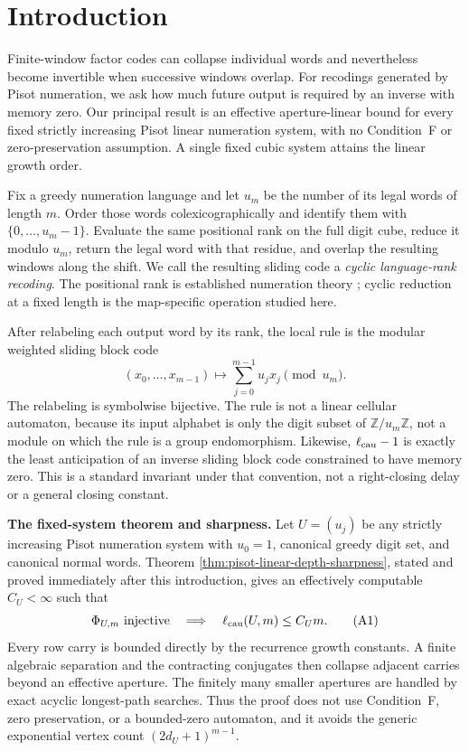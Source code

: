 \section{Introduction}\label{sec:intro}

Finite-window factor codes can collapse individual words and nevertheless
become invertible when successive windows overlap.  For recodings generated
by Pisot numeration, we ask how much future output is required by an inverse
with memory zero.  Our principal result is an effective aperture-linear bound
for every fixed strictly increasing Pisot linear numeration system, with no
Condition~F or zero-preservation assumption.  A single fixed cubic system
attains the linear growth order.

Fix a greedy numeration language and let $u_m$ be the number of its legal
words of length $m$.  Order those words colexicographically and identify them
with $\{0,\ldots,u_m-1\}$.  Evaluate the same positional rank on the full
digit cube, reduce it modulo $u_m$, return the legal word with that residue,
and overlap the resulting windows along the shift.  We call the resulting
sliding code a \emph{cyclic language-rank recoding}.  The positional rank is
established numeration theory
\cite{BertrandMathis1989,BruyereHansel1997,LecomteRigo2001,
CharlierCisterninoStipulanti2022}; cyclic reduction at a fixed length is the
map-specific operation studied here.

After relabeling each output word by its rank, the local rule is the modular
weighted sliding block code
\[
(x_0,\ldots,x_{m-1})\longmapsto
\sum_{j=0}^{m-1}u_jx_j\pmod {u_m}.
\]
The relabeling is symbolwise bijective.  The rule is not a linear cellular
automaton, because its input alphabet is only the digit subset of
$\mathbb Z/u_m\mathbb Z$, not a module on which the rule is a group
endomorphism.  Likewise, $\ell_{\rm cau}-1$ is exactly the least anticipation
of an inverse sliding block code constrained to have memory zero.  This is a
standard invariant under that convention, not a right-closing delay or a
general closing constant.

\medskip
\noindent\textbf{The fixed-system theorem and sharpness.}
Let $U=(u_j)$ be any strictly increasing Pisot numeration system with
$u_0=1$, canonical greedy digit set, and canonical normal words.  Theorem
\ref{thm:pisot-linear-depth-sharpness}, stated and proved immediately after
this introduction, gives an effectively computable $C_U<\infty$ such that
\[
\Phi_{U,m}\text{ injective}\quad\Longrightarrow\quad
\ell_{\rm cau}(U,m)\le C_Um. \tag{A1}
\]
Every row carry is bounded directly by the recurrence growth constants.  A
finite algebraic separation and the contracting conjugates then collapse
adjacent carries beyond an effective aperture.  The finitely many smaller
apertures are handled by exact acyclic longest-path searches.  Thus the proof
does not use Condition~F, zero preservation, or a bounded-zero automaton, and
it avoids the generic exponential vertex count $(2d_U+1)^{m-1}$.

